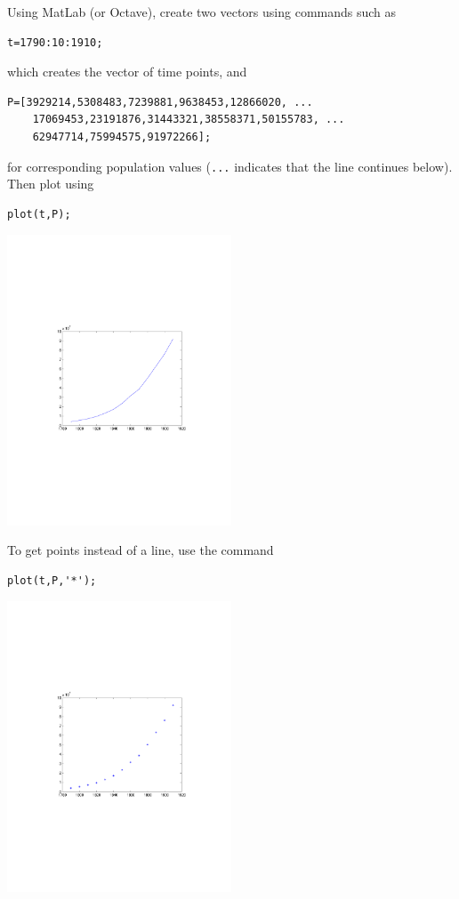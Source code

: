 Using MatLab (or Octave), create two vectors using commands such as
\begin{verbatim}
t=1790:10:1910;
\end{verbatim}
which creates the vector of time points, and 
\begin{verbatim}
P=[3929214,5308483,7239881,9638453,12866020, ...
    17069453,23191876,31443321,38558371,50155783, ...
    62947714,75994575,91972266];
\end{verbatim}
for corresponding population values ({\tt ...} indicates that the line continues below).
Then plot using
\begin{verbatim}
plot(t,P);
\end{verbatim}
\begin{center}
\includegraphics[width=0.5\textwidth]{../figs_02_population_growth/USpop_to1910}
\end{center}
To get points instead of a line, use the command
\begin{verbatim}
plot(t,P,'*');
\end{verbatim}
\begin{center}
\includegraphics[width=0.5\textwidth]{../figs_02_population_growth/USpop_to1910_points}
\end{center}

